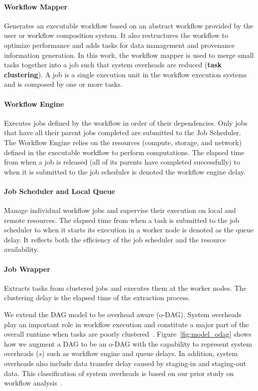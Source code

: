 \paragraph{Workflow Mapper} Generates an executable workflow based on an abstract workflow provided by the user or workflow composition system. It also restructures the workflow to optimize performance and adds tasks for data management and provenance information generation. In this work, the workflow mapper is used to merge small tasks together into a job such that system overheads are reduced (\textbf{task clustering}). A job is a single execution unit in the workflow execution systems and is composed by one or more tasks. 


\paragraph{Workflow Engine} Executes jobs defined by the workflow in order of their dependencies. Only jobs that have all their parent jobs completed are submitted to the Job Scheduler. The Workflow Engine relies on the resources (compute, storage, and network) defined in the executable workflow to perform computations. The elapsed time from when a job is released (all of its parents have completed successfully) to when it is submitted to the job scheduler is denoted the workflow engine delay. %

\paragraph{Job Scheduler and Local Queue} Manage individual workflow jobs and supervise their execution on local and remote resources. The elapsed time from when a task is submitted to the job scheduler to when it starts its execution in a worker node is denoted as the queue delay. It reflects both the efficiency of the job scheduler and the resource availability. 

\paragraph{Job Wrapper} Extracts tasks from clustered jobs and executes them at the worker nodes. The clustering delay is the  elapsed time of the extraction process.

We extend the DAG model to be overhead aware (o-DAG). System overheads play an important role in workflow execution and constitute a major part of the overall runtime when tasks are poorly clustered~\cite{Chen2011}. Figure~\ref{fig:model_odag} shows how we augment a DAG to be an o-DAG with the capability to represent system overheads ($s$) such as workflow engine and queue delays. In addition, system overheads also include data transfer delay caused by staging-in and staging-out data. This classification of system overheads is based on our prior study on workflow analysis~\cite{Chen2011}. 

